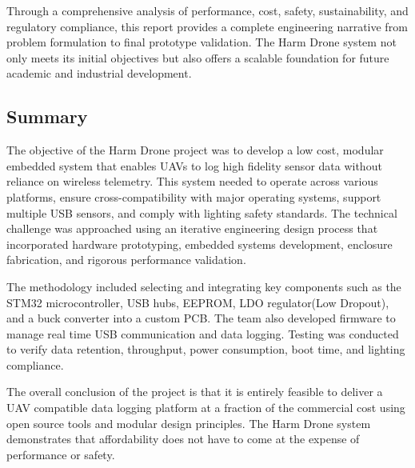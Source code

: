 \documentclass[12pt]{article}
\begin{document}
\par Through a comprehensive analysis of performance, cost, safety, sustainability, and regulatory compliance, this report provides a complete engineering narrative from problem formulation to final prototype validation. The Harm Drone system not only meets its initial objectives but also offers a scalable foundation for future academic and industrial development.

\subsection*{Summary}

\par The objective of the Harm Drone project was to develop a low cost, modular embedded system that enables UAVs to log high fidelity sensor data without reliance on wireless telemetry. This system needed to operate across various platforms, ensure cross-compatibility with major operating systems, support multiple USB sensors, and comply with lighting safety standards. The technical challenge was approached using an iterative engineering design process that incorporated hardware prototyping, embedded systems development, enclosure fabrication, and rigorous performance validation.

\par The methodology included selecting and integrating key components such as the STM32 microcontroller, USB hubs, EEPROM, LDO regulator(Low Dropout), and a buck converter into a custom PCB. The team also developed firmware to manage real time USB communication and data logging. Testing was conducted to verify data retention, throughput, power consumption, boot time, and lighting compliance. 

\par The overall conclusion of the project is that it is entirely feasible to deliver a UAV compatible data logging platform at a fraction of the commercial cost using open source tools and modular design principles. The Harm Drone system demonstrates that affordability does not have to come at the expense of performance or safety.
\end{document}
